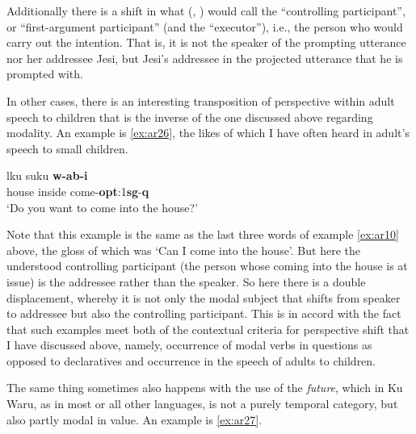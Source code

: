 \documentclass[output=paper]{langsci/langscibook}
\begin{document}
Additionally there is a shift in what \citeauthor{Nuyts2005a} (\citeyear{Nuyts2005a}, \citeyear{Nuyts2005b}) would call the “controlling participant”, or “first-argument participant” (and \citealt{Lehmann2012} the “executor”), i.e., the person who would carry out the intention. That is, it is not the speaker of the prompting utterance nor her addressee Jesi, but Jesi’s addressee in the projected utterance that he is prompted with.

In other cases, there is an interesting transposition of perspective within adult speech to children that is the inverse of the one discussed above regarding modality. An example is \ref{ex:ar26}, the likes of which I have often heard in adult’s speech to small children.

\begin{exe}
	\ex \label{ex:ar26}
	\gll lku suku \textbf{w-ab-i}\\
	house inside come-\textbf{opt}:1\textbf{sg}-\textbf{q}\\
	\trans ‘Do you want to come into the house?’
\end{exe}

Note that this example is the same as the last three words of example \ref{ex:ar10} above, the gloss of which was ‘Can I come into the house’.  But here the understood controlling participant (the person whose coming into the house is at issue) is the addressee rather than the speaker. So here there is a double displacement, whereby it is not only the modal subject that shifts from speaker to addressee but also the controlling participant. This is in accord with the fact that such examples meet both of the contextual criteria for perspective shift that I have discussed above, namely, occurrence of modal verbs in questions as opposed to declaratives and occurrence in the speech of adults to children.

The same thing sometimes also happens with the use of the \textit{future}, which in Ku Waru, as in most or all other languages, is not a purely temporal category, but also partly modal in value. An example is \ref{ex:ar27}.
\end{document}
